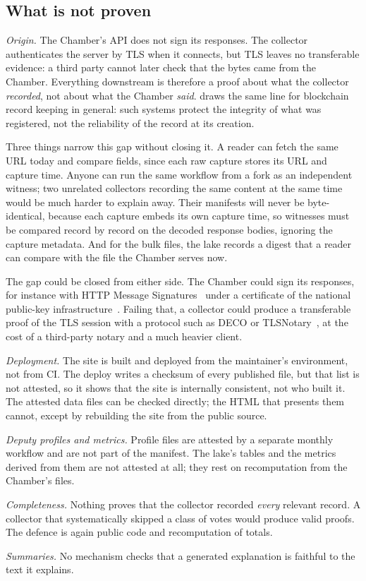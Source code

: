 \subsection{What is not proven}
\label{sec:notproven}

\emph{Origin.} The Chamber's API does not sign its responses. The collector authenticates the server by TLS when it connects, but TLS leaves no transferable evidence: a third party cannot later check that the bytes came from the Chamber. Everything downstream is therefore a proof about what the collector \emph{recorded}, not about what the Chamber \emph{said}. \citet{lemieux2016trusting} draws the same line for blockchain record keeping in general: such systems protect the integrity of what was registered, not the reliability of the record at its creation.

Three things narrow this gap without closing it. A reader can fetch the same URL today and compare fields, since each raw capture stores its URL and capture time. Anyone can run the same workflow from a fork as an independent witness; two unrelated collectors recording the same content at the same time would be much harder to explain away. Their manifests will never be byte-identical, because each capture embeds its own capture time, so witnesses must be compared record by record on the decoded response bodies, ignoring the capture metadata. And for the bulk files, the lake records a digest that a reader can compare with the file the Chamber serves now.

The gap could be closed from either side. The Chamber could sign its responses, for instance with HTTP Message Signatures~\citep{rfc9421} under a certificate of the national public-key infrastructure~\citep{mp2200-2}. Failing that, a collector could produce a transferable proof of the TLS session with a protocol such as DECO or TLSNotary~\citep{zhang2020deco,tlsnotary}, at the cost of a third-party notary and a much heavier client.

\emph{Deployment.} The site is built and deployed from the maintainer's environment, not from CI. The deploy writes a checksum of every published file, but that list is not attested, so it shows that the site is internally consistent, not who built it. The attested data files can be checked directly; the HTML that presents them cannot, except by rebuilding the site from the public source.

\emph{Deputy profiles and metrics.} Profile files are attested by a separate monthly workflow and are not part of the manifest. The lake's tables and the metrics derived from them are not attested at all; they rest on recomputation from the Chamber's files.

\emph{Completeness.} Nothing proves that the collector recorded \emph{every} relevant record. A collector that systematically skipped a class of votes would produce valid proofs. The defence is again public code and recomputation of totals.

\emph{Summaries.} No mechanism checks that a generated explanation is faithful to the text it explains.

